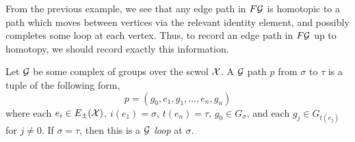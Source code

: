 From the previous example, we see that any edge path in $F\mathcal{G}$ is homotopic to a path which moves between vertices via the relevant identity element, and possibly completes some loop at each vertex.
Thus, to record an edge path in $F\mathcal{G}$ up to homotopy, we should record exactly this information.

\begin{definition}
	Let $\mathcal{G}$ be some complex of groups over the scwol $\mathcal{X}$.
	A $\mathcal{G}$ path $p$ from $\sigma$ to  $\tau$ is a tuple of the following form,
	\[
		p = (g_0, e_1, g_1, \ldots ,e_n, g_n)
	\]
	where each $e_i \in E_\pm(\mathcal{X})$, $i(e_1) = \sigma$, $t(e_n)=\tau$, $g_0 \in G_\sigma$, and each $g_j \in G_{t(e_j)}$ for  $j \neq 0$.
	If $\sigma=\tau$, then this is a \emph{ $\mathcal{G}$ loop} at  $\sigma$.
	\label{def:paths_in_complexes_of_groups}
\end{definition}


